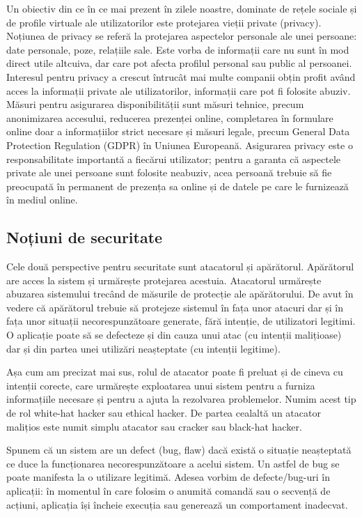 Un obiectiv din ce în ce mai prezent în zilele noastre, dominate de rețele sociale și de profile virtuale ale utilizatorilor este protejarea vieții private (privacy). Noțiunea de privacy se referă la protejarea aspectelor personale ale unei persoane: date personale, poze, relațiile sale. Este vorba de informații care nu sunt în mod direct utile altcuiva, dar care pot afecta profilul personal sau public al persoanei. Interesul pentru privacy a crescut întrucât mai multe companii obțin profit având acces la informații private ale utilizatorilor, informații care pot fi folosite abuziv. Măsuri pentru asigurarea disponibilității sunt măsuri tehnice, precum anonimizarea accesului, reducerea prezenței online, completarea în formulare online doar a informațiilor strict necesare și măsuri legale, precum General Data Protection Regulation (GDPR) în Uniunea Europeană. Asigurarea privacy este o responsabilitate importantă a fiecărui utilizator; pentru a garanta că aspectele private ale unei persoane sunt folosite neabuziv, acea persoană trebuie să fie preocupată în permanent de prezența sa online și de datele pe care le furnizează în mediul online.

\subsection{Noțiuni de securitate}
\label{sec:sec:notions}

Cele două perspective pentru securitate sunt atacatorul și apărătorul. Apărătorul are acces la sistem și urmărește protejarea acestuia. Atacatorul urmărește abuzarea sistemului trecând de măsurile de protecție ale apărătorului. De avut în vedere că apărătorul trebuie să protejeze sistemul în fața unor atacuri dar și în fața unor situații necorespunzătoare generate, fără intenție, de utilizatori legitimi. O aplicație poate să se defecteze și din cauza unui atac (cu intenții malițioase) dar și din partea unei utilizări neașteptate (cu intenții legitime).

Așa cum am precizat mai sus, rolul de atacator poate fi preluat și de cineva cu intenții corecte, care urmărește exploatarea unui sistem pentru a furniza informațiile necesare și pentru a ajuta la rezolvarea problemelor. Numim acest tip de rol white-hat hacker sau ethical hacker. De partea cealaltă un atacator malițios este numit simplu atacator sau cracker sau black-hat hacker.

Spunem că un sistem are un defect (bug, flaw) dacă există o situație neașteptată ce duce la funcționarea necorespunzătoare a acelui sistem. Un astfel de bug se poate manifesta la o utilizare legitimă. Adesea vorbim de defecte/bug-uri în aplicații: în momentul în care folosim o anumită comandă sau o secvență de acțiuni, aplicația își încheie execuția sau generează un comportament inadecvat.

